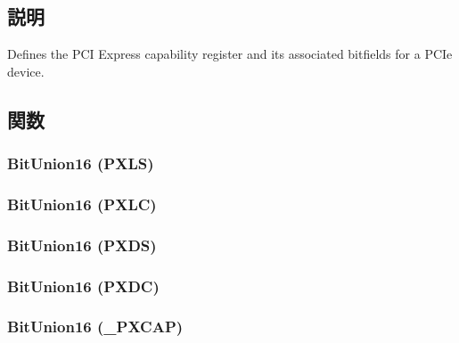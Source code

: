 \subsection{説明}
Defines the PCI Express capability register and its associated bitfields for a PCIe device. 

\subsection{関数}
\hypertarget{structPXCAP_a506258ffa4ec7100aaa3f99297d05e8b}{
\subsubsection[{BitUnion16}]{\setlength{\rightskip}{0pt plus 5cm}BitUnion16 (PXLS)}}
\label{structPXCAP_a506258ffa4ec7100aaa3f99297d05e8b}
\hypertarget{structPXCAP_acc928ca85aa385937cc6ed75db137698}{
\subsubsection[{BitUnion16}]{\setlength{\rightskip}{0pt plus 5cm}BitUnion16 (PXLC)}}
\label{structPXCAP_acc928ca85aa385937cc6ed75db137698}
\hypertarget{structPXCAP_a56e3fb571dced6898a2faceb3ab35a55}{
\subsubsection[{BitUnion16}]{\setlength{\rightskip}{0pt plus 5cm}BitUnion16 (PXDS)}}
\label{structPXCAP_a56e3fb571dced6898a2faceb3ab35a55}
\hypertarget{structPXCAP_a81ea925a63ed493f2925de1b08d6210a}{
\subsubsection[{BitUnion16}]{\setlength{\rightskip}{0pt plus 5cm}BitUnion16 (PXDC)}}
\label{structPXCAP_a81ea925a63ed493f2925de1b08d6210a}
\hypertarget{structPXCAP_a1af8aae58f1c51753f89bf0e535d4e26}{
\subsubsection[{BitUnion16}]{\setlength{\rightskip}{0pt plus 5cm}BitUnion16 (\_\-PXCAP)}}
